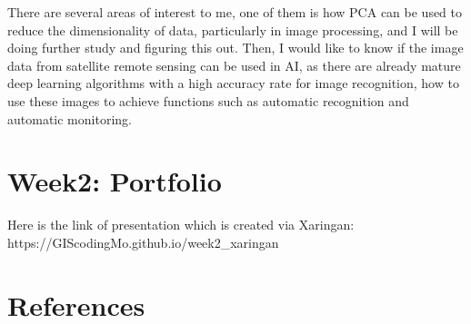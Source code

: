 \documentclass[
  letterpaper,
  DIV=11,
  numbers=noendperiod]{scrreprt}
\newlength{\cslhangindent}
\newlength{\cslentryspacingunit} %
\newenvironment{CSLReferences}[2] %
 {%
  \setlength{\parindent}{0pt}
  \ifodd #1
  \let\oldpar\par
  \def\par{\hangindent=\cslhangindent\oldpar}
  \fi
  \setlength{\parskip}{#2\cslentryspacingunit}
 }%
 {}
\begin{document}
There are several areas of interest to me, one of them is how PCA can be
used to reduce the dimensionality of data, particularly in image
processing, and I will be doing further study and figuring this out.
Then, I would like to know if the image data from satellite remote
sensing can be used in AI, as there are already mature deep learning
algorithms with a high accuracy rate for image recognition, how to use
these images to achieve functions such as automatic recognition and
automatic monitoring.


\hypertarget{week2-portfolio}{%
\chapter{Week2: Portfolio}\label{week2-portfolio}}

Here is the link of presentation which is created via Xaringan:
https://GIScodingMo.github.io/week2\_xaringan


\hypertarget{references}{%
\chapter*{References}\label{references}}


\hypertarget{refs}{}
\begin{CSLReferences}{0}{0}
\end{CSLReferences}
\end{document}
